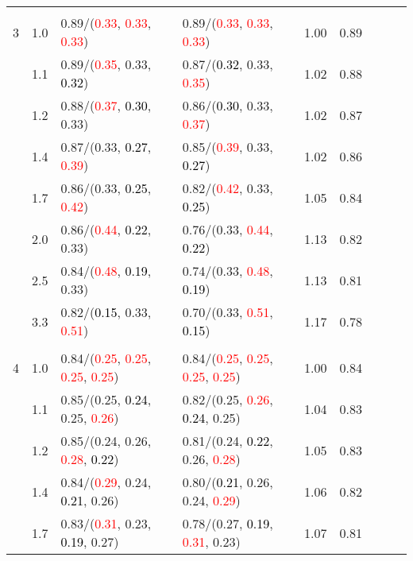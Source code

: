 \documentclass[10pt,a4paper]{report}
\begin{document}
\begin{table}[!htbp]
\begin{center}
{\begin{tabular}{ccllccccc}
			&&&&\\
			3			&1.0&0.89/(\textcolor{red}{0.33}, \textcolor{red}{0.33}, \textcolor{red}{0.33})&0.89/(\textcolor{red}{0.33}, \textcolor{red}{0.33}, \textcolor{red}{0.33})&1.00&0.89\\
			&1.1&0.89/(\textcolor{red}{0.35}, 0.33, \textcolor{black}{0.32})&0.87/(\textcolor{black}{0.32}, 0.33, \textcolor{red}{0.35})&1.02&0.88\\
			&1.2&0.88/(\textcolor{red}{0.37}, \textcolor{black}{0.30}, 0.33)&0.86/(\textcolor{black}{0.30}, 0.33, \textcolor{red}{0.37})&1.02&0.87\\
			&1.4&0.87/(0.33, \textcolor{black}{0.27}, \textcolor{red}{0.39})&0.85/(\textcolor{red}{0.39}, 0.33, \textcolor{black}{0.27})&1.02&0.86\\
			&1.7&0.86/(0.33, \textcolor{black}{0.25}, \textcolor{red}{0.42})&0.82/(\textcolor{red}{0.42}, 0.33, \textcolor{black}{0.25})&1.05&0.84\\
			&2.0&0.86/(\textcolor{red}{0.44}, \textcolor{black}{0.22}, 0.33)&0.76/(0.33, \textcolor{red}{0.44}, \textcolor{black}{0.22})&1.13&0.82\\
			&2.5&0.84/(\textcolor{red}{0.48}, \textcolor{black}{0.19}, 0.33)&0.74/(0.33, \textcolor{red}{0.48}, \textcolor{black}{0.19})&1.13&0.81\\
			&3.3&0.82/(\textcolor{black}{0.15}, 0.33, \textcolor{red}{0.51})&0.70/(0.33, \textcolor{red}{0.51}, \textcolor{black}{0.15})&1.17&0.78\\
			&&&&\\
			4			&1.0&0.84/(\textcolor{red}{0.25}, \textcolor{red}{0.25}, \textcolor{red}{0.25}, \textcolor{red}{0.25})&0.84/(\textcolor{red}{0.25}, \textcolor{red}{0.25}, \textcolor{red}{0.25}, \textcolor{red}{0.25})&1.00&0.84\\
			&1.1&0.85/(0.25, \textcolor{black}{0.24}, 0.25, \textcolor{red}{0.26})&0.82/(0.25, \textcolor{red}{0.26}, \textcolor{black}{0.24}, 0.25)&1.04&0.83\\
			&1.2&0.85/(0.24, 0.26, \textcolor{red}{0.28}, \textcolor{black}{0.22})&0.81/(0.24, \textcolor{black}{0.22}, 0.26, \textcolor{red}{0.28})&1.05&0.83\\
			&1.4&0.84/(\textcolor{red}{0.29}, 0.24, \textcolor{black}{0.21}, 0.26)&0.80/(\textcolor{black}{0.21}, 0.26, 0.24, \textcolor{red}{0.29})&1.06&0.82\\
			&1.7&0.83/(\textcolor{red}{0.31}, 0.23, \textcolor{black}{0.19}, 0.27)&0.78/(0.27, \textcolor{black}{0.19}, \textcolor{red}{0.31}, 0.23)&1.07&0.81\\

\end{tabular}}
\end{center}
\end{table}
\end{document}

